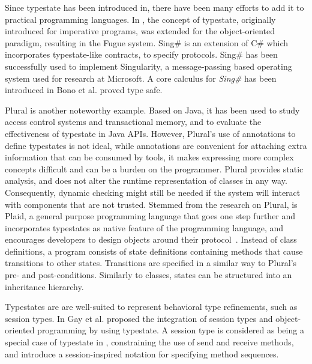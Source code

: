 Since typestate has been introduced in\cite{typestates}, there have been many efforts to add it to practical programming languages.
In \cite{FahndrichM:typo}, the concept of typestate, originally introduced for imperative programs, was extended for the object-oriented paradigm, resulting in the Fugue system. Sing\# \cite{FahndrichM:lansfr} is an extension of C\# which incorporates typestate-like contracts, to specify protocols. Sing\# has been successfully used to implement Singularity, a message-passing based operating system used for research at Microsoft. A core calculus for \emph{Sing\#} has been introduced in Bono {et al.} \cite{BonoV:typcmp} proved type safe.

Plural\cite{Bierhoff.etal:practicalapichecking} is another noteworthy example. Based on Java, it has been used to study access control systems\cite{BierhoffAldrich:aliasedobjects} and transactional memory\cite{Beckman.etal:atomicblockstypestates}, and to evaluate the effectiveness of typestate in Java APIs\cite{Bierhoff.etal:practicalapichecking}. However, Plural's use of annotations to define typestates is not ideal, while annotations are convenient for attaching extra information that can be consumed by tools, it makes expressing more complex concepts difficult and can be a burden on the programmer. Plural provides static analysis, and does not alter the runtime representation of classes in any way. Consequently, dynamic checking might still be needed if the system will interact with components that are not trusted.
Stemmed from the research on Plural, is Plaid, a general purpose programming language that goes one step further and incorporates typestates as native feature of the programming language, and encourages developers  to design objects around their protocol~\cite{DBLP:conf/oopsla/AldrichSSS09,DBLP:conf/oopsla/SunshineNSAT11}. Instead of class definitions,
a program consists of state definitions containing methods that cause
transitions to other states. Transitions are specified in a similar way
to Plural's pre- and post-conditions. Similarly to classes, states can be structured
into an inheritance hierarchy.


Typestates are are well-suited to represent behavioral type refinements, such as session types. In \cite{gay.vasconcelos.etal_modular-session-types} Gay et al. proposed the integration of session types and object-oriented programming by using typestate.
A session type is considered as being a special case of typestate in \cite{gay.vasconcelos.etal_modular-session-types}, constraining the use of send and receive methods, and introduce a session-inspired notation for specifying method sequences.


